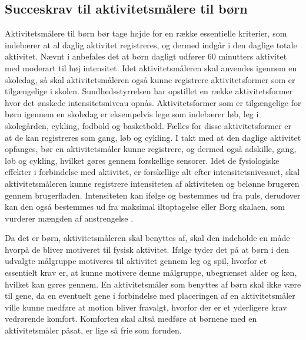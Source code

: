 \subsection{Succeskrav til aktivitetsmålere til børn} \label{succeskrav}

Aktivitetsmålere til børn bør tage højde for en række essentielle kriterier, som indebærer at al daglig aktivitet registreres, og dermed indgår i den daglige totale aktivitet. 
Nævnt i  anbefales det at børn dagligt udfører 60 minutters aktivitet med moderart til høj intensitet. Idet aktivitetsmåleren skal anvendes igennem en skoledag, så skal aktivitetsmåleren også kunne registrere aktivitetsformer som er tilgængelige i skolen. Sundhedsstyrrelsen har opstillet en række aktivitetsformer hvor det ønskede intensitetsniveau opnås. Aktivitetsformer som er tilgængelige for børn igennem en skoledag er eksempelvis lege som indebærer løb, leg i skolegården, cykling, fodbold og basketbold. Fælles for disse aktivitetsformer er at de kan registreres som gang, løb og cykling. \citep{Sundhedsstyrrelsen2003}
I takt med at den daglige aktivitet opfanges, bør en aktivitetsmåler kunne registrere, og dermed også adskille, gang, løb og cykling, hvilket gøres gennem forskellige sensorer. 
Idet de fysiologiske effekter i forbindelse med aktivitet, er forskellige alt efter intensitetsniveauet, skal aktivitetsmåleren kunne registrere intensiteten af aktiviteten og belønne brugeren gennem brugerfladen. Intensiteten kan ifølge  og  bestemmes ud fra puls, derudover kan den også bestemmes ud fra maksimal iltoptagelse eller Borg skalaen, som vurderer mængden af anstrengelse \citep{Kiens2007}. 

Da det er børn, aktivitetsmåleren skal benyttes af, skal den indeholde en måde hvorpå de bliver motiveret til fysisk aktivitet. Ifølge  tyder det på at børn i den udvalgte målgruppe motiveres til aktivitet gennem leg og spil, hvorfor et essentielt krav er, at kunne motivere denne målgruppe, ubegrænset alder og køn, hvilket kan gøres gennem. \newline
En aktivitetsmåler som benyttes af børn skal ikke være til gene, da en eventuelt gene i forbindelse med placeringen af en aktivitetsmåler ville kunne medføre at motion bliver fravalgt, hvorfor der er et yderligere krav vedrørende komfort. Komforten skal altså medføre at børnene med en aktivitetsmåler påsat, er lige så frie som foruden.


